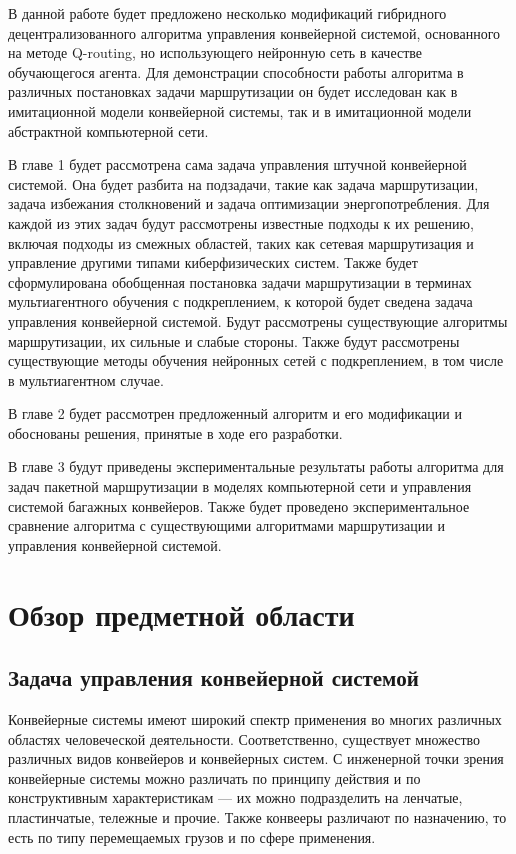 \documentclass[specification,annotation,times]{itmo-student-thesis}
\theoremstyle{definition}
\begin{document}
В данной работе будет предложено несколько модификаций гибридного децентрализованного
алгоритма управления конвейерной системой, основанного на методе Q-routing, но
использующего нейронную сеть в качестве обучающегося агента. Для демонстрации
способности работы алгоритма в различных постановках задачи маршрутизации он
будет исследован как в имитационной модели конвейерной системы, так и в
имитационной модели абстрактной компьютерной сети.

В главе 1 будет рассмотрена сама задача управления штучной конвейерной системой.
Она будет разбита на подзадачи, такие как задача маршрутизации, задача
избежания столкновений и задача оптимизации энергопотребления. Для каждой из
этих задач будут рассмотрены известные подходы к их решению, включая подходы
из смежных областей, таких как сетевая маршрутизация и управление другими типами
киберфизических систем. Также будет сформулирована обобщенная постановка
задачи маршрутизации в терминах мультиагентного обучения с подкреплением, к
которой будет сведена задача управления конвейерной системой. Будут рассмотрены
существующие алгоритмы маршрутизации, их сильные и слабые стороны. Также будут
рассмотрены существующие методы обучения нейронных сетей с подкреплением, в том
числе в мультиагентном случае.

В главе 2 будет рассмотрен предложенный алгоритм и его модификации и обоснованы
решения, принятые в ходе его разработки.

В главе 3 будут приведены экспериментальные результаты работы алгоритма для
задач пакетной маршрутизации в моделях компьютерной сети и управления системой багажных
конвейеров. Также будет проведено экспериментальное сравнение алгоритма с
существующими алгоритмами маршрутизации и управления конвейерной системой.

\chapter{Обзор предметной области}

\startrelatedwork

\section{Задача управления конвейерной системой}

Конвейерные системы имеют широкий спектр применения во многих различных областях
человеческой деятельности. Соответственно, существует множество различных видов
конвейеров и конвейерных систем. С инженерной точки зрения конвейерные системы
можно различать по принципу действия и по конструктивным характеристикам
--- их можно подразделить на ленчатые, пластинчатые, тележные и прочие.
Также конвееры различают по назначению, то есть по типу перемещаемых грузов и по
сфере применения.
\end{document}
